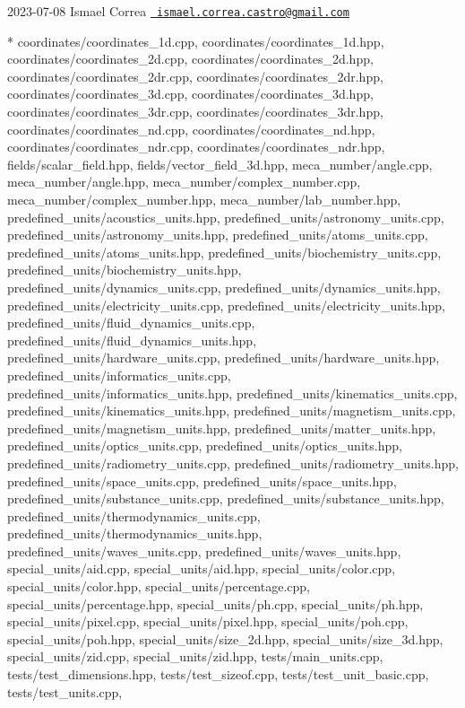  2023-\/07-\/08 Ismael Correa \href{mailto:ismael.correa.castro@gmail.com}{\texttt{ ismael.\+correa.\+castro@gmail.\+com}} \begin{DoxyVerb}* coordinates/coordinates_1d.cpp, coordinates/coordinates_1d.hpp,
coordinates/coordinates_2d.cpp, coordinates/coordinates_2d.hpp,
coordinates/coordinates_2dr.cpp, coordinates/coordinates_2dr.hpp,
coordinates/coordinates_3d.cpp, coordinates/coordinates_3d.hpp,
coordinates/coordinates_3dr.cpp, coordinates/coordinates_3dr.hpp,
coordinates/coordinates_nd.cpp, coordinates/coordinates_nd.hpp,
coordinates/coordinates_ndr.cpp, coordinates/coordinates_ndr.hpp,
fields/scalar_field.hpp, fields/vector_field_3d.hpp,
meca_number/angle.cpp, meca_number/angle.hpp,
meca_number/complex_number.cpp, meca_number/complex_number.hpp,
meca_number/lab_number.hpp, predefined_units/acoustics_units.hpp,
predefined_units/astronomy_units.cpp,
predefined_units/astronomy_units.hpp,
predefined_units/atoms_units.cpp, predefined_units/atoms_units.hpp,
predefined_units/biochemistry_units.cpp,
predefined_units/biochemistry_units.hpp,
predefined_units/dynamics_units.cpp,
predefined_units/dynamics_units.hpp,
predefined_units/electricity_units.cpp,
predefined_units/electricity_units.hpp,
predefined_units/fluid_dynamics_units.cpp,
predefined_units/fluid_dynamics_units.hpp,
predefined_units/hardware_units.cpp,
predefined_units/hardware_units.hpp,
predefined_units/informatics_units.cpp,
predefined_units/informatics_units.hpp,
predefined_units/kinematics_units.cpp,
predefined_units/kinematics_units.hpp,
predefined_units/magnetism_units.cpp,
predefined_units/magnetism_units.hpp,
predefined_units/matter_units.hpp,
predefined_units/optics_units.cpp,
predefined_units/optics_units.hpp,
predefined_units/radiometry_units.cpp,
predefined_units/radiometry_units.hpp,
predefined_units/space_units.cpp, predefined_units/space_units.hpp,
predefined_units/substance_units.cpp,
predefined_units/substance_units.hpp,
predefined_units/thermodynamics_units.cpp,
predefined_units/thermodynamics_units.hpp,
predefined_units/waves_units.cpp, predefined_units/waves_units.hpp,
special_units/aid.cpp, special_units/aid.hpp,
special_units/color.cpp, special_units/color.hpp,
special_units/percentage.cpp, special_units/percentage.hpp,
special_units/ph.cpp, special_units/ph.hpp,
special_units/pixel.cpp, special_units/pixel.hpp,
special_units/poh.cpp, special_units/poh.hpp,
special_units/size_2d.hpp, special_units/size_3d.hpp,
special_units/zid.cpp, special_units/zid.hpp, tests/main_units.cpp,
tests/test_dimensions.hpp, tests/test_sizeof.cpp,
tests/test_unit_basic.cpp, tests/test_units.cpp,

\end{DoxyVerb}
